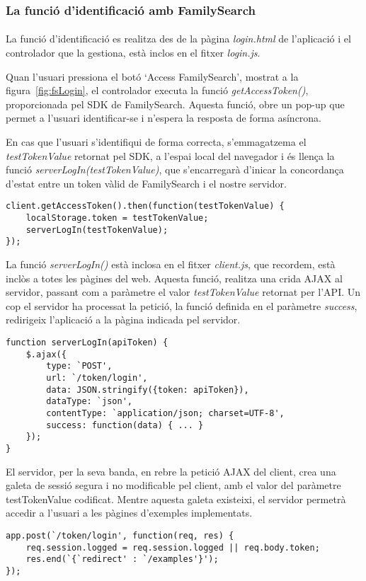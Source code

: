 \subsubsection{La funció d'identificació amb FamilySearch}

\paragraph{}
La funció d'identificació es realitza des de la pàgina \emph{login.html} de l'aplicació i el controlador que la gestiona, està inclos en el fitxer \emph{login.js}.

Quan l'usuari pressiona el botó `Access FamilySearch', mostrat a la figura~\ref{fig:fsLogin}, el controlador executa la funció \emph{getAccessToken()}, proporcionada pel SDK de FamilySearch. Aquesta funció, obre un pop-up que permet a l'usuari identificar-se i n'espera la resposta de forma asíncrona.

En cas que l'usuari s'identifiqui de forma correcta, s'emmagatzema el \emph{testTokenValue} retornat pel SDK, a l'espai local del navegador i és llença la funció \emph{serverLogIn(testTokenValue)}, que s'encarregarà d'inicar la concordança d'estat entre un token vàlid de FamilySearch i el nostre servidor.

\begin{lstlisting}[style=rawOwn,caption={Petició al SDK de Javascript d'un token d'identificació}]
client.getAccessToken().then(function(testTokenValue) {
    localStorage.token = testTokenValue;
    serverLogIn(testTokenValue);
});
\end{lstlisting}

La funció \emph{serverLogIn()} està inclosa en el fitxer \emph{client.js}, que recordem, està inclòs a totes les pàgines del web. Aquesta funció, realitza una crida AJAX al servidor, passant com a paràmetre el valor \emph{testTokenValue} retornat per l'API. Un cop el servidor ha processat la petició, la funció definida en el paràmetre \emph{success}, redirigeix l'aplicació a la pàgina indicada pel servidor.

\begin{lstlisting}[style=rawOwn,caption={Crida AJAX al servidor amb el token retornat pel SDK}]
function serverLogIn(apiToken) {
    $.ajax({
        type: `POST',
        url: `/token/login',
        data: JSON.stringify({token: apiToken}),
        dataType: `json',
        contentType: `application/json; charset=UTF-8',
        success: function(data) { ... }
    });
}
\end{lstlisting}

El servidor, per la seva banda, en rebre la petició AJAX del client, crea una galeta de sessió segura i no modificable pel client, amb el valor del paràmetre testTokenValue codificat. Mentre aquesta galeta existeixi, el servidor permetrà accedir a l'usuari a les pàgines d'exemples implementats.

\begin{lstlisting}[style=rawOwn,caption={Petició POST d'identificació processada pel servidor}]
app.post(`/token/login', function(req, res) {
    req.session.logged = req.session.logged || req.body.token;
    res.end(`{`redirect' : `/examples'}');
});
\end{lstlisting}
